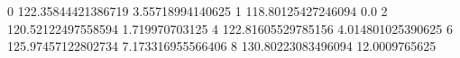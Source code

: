 0 122.35844421386719 3.55718994140625
1 118.80125427246094 0.0
2 120.52122497558594 1.719970703125
4 122.81605529785156 4.014801025390625
6 125.97457122802734 7.173316955566406
8 130.80223083496094 12.0009765625
